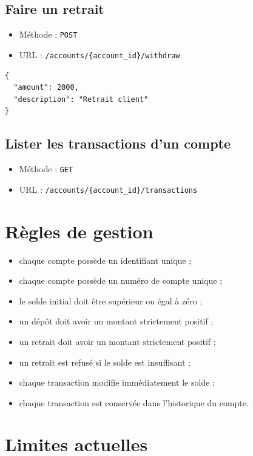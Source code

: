 \documentclass[12pt,a4paper]{article}
\begin{document}
\subsection{Faire un retrait}

\begin{itemize}
    \item Méthode : \texttt{POST}
    \item URL : \texttt{/accounts/\{account\_id\}/withdraw}
\end{itemize}

\begin{verbatim}
{
  "amount": 2000,
  "description": "Retrait client"
}
\end{verbatim}

\subsection{Lister les transactions d'un compte}

\begin{itemize}
    \item Méthode : \texttt{GET}
    \item URL : \texttt{/accounts/\{account\_id\}/transactions}
\end{itemize}

\section{Règles de gestion}

\begin{itemize}
    \item chaque compte possède un identifiant unique ;
    \item chaque compte possède un numéro de compte unique ;
    \item le solde initial doit être supérieur ou égal à zéro ;
    \item un dépôt doit avoir un montant strictement positif ;
    \item un retrait doit avoir un montant strictement positif ;
    \item un retrait est refusé si le solde est insuffisant ;
    \item chaque transaction modifie immédiatement le solde ;
    \item chaque transaction est conservée dans l'historique du compte.
\end{itemize}

\section{Limites actuelles}
\end{document}
